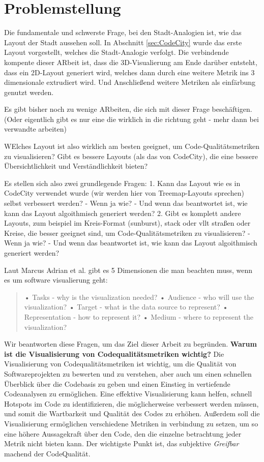 \section{Problemstellung} \label{sec:Problemstellung}
Die fundamentale und schwerste Frage, bei den Stadt-Analogien ist, wie das Layout der Stadt aussehen soll. In Abschnitt \ref{sec:CodeCity} wurde das erste Layout vorgestellt, welches die Stadt-Analogie verfolgt. Die verbindende kompente dieser ARbeit ist, dass die 3D-Visualierung am Ende darüber entsteht, dass ein 2D-Layout generiert wird, welches dann durch eine weitere Metrik ins 3 dimensionale extrudiert wird. Und Anschließend weitere Metriken als einfärbung genutzt werden.

Es gibt bisher noch zu wenige ARbeiten, die sich mit dieser Frage beschäftigen. (Oder eigentlich gibt es nur eine die wirklich in die richtung geht - mehr dann bei verwandte arbeiten)

WElches Layout ist also wirklich am besten geeignet, um Code-Qualitätsmetriken zu visualisieren? Gibt es bessere Layouts (als das von CodeCity), die eine bessere Übersichtlichkeit und Verständlichkeit bieten? 

Es stellen sich also zwei grundlegende Fragen:
1. Kann das Layout wie es in CodeCity verwendet wurde (wir werden hier von Treemap-Layouts sprechen) selbst verbessert werden? - Wenn ja wie? - Und wenn das beantwortet ist, wie kann das Layout algoithmisch generiert werden?
2. Gibt es komplett andere Layouts, zum beispiel im Kreis-Format (sunburst), stack oder vllt straßen oder Kreise, die besser geeignet sind, um Code-Qualitätsmetriken zu visualisieren? - Wenn ja wie? - Und wenn das beantwortet ist, wie kann das Layout algoithmisch generiert werden?

Laut Marcus Adrian et al.  gibt es 5 Dimensionen die man beachten muss, wenn es um software visualierung geht: 
\begin{quote}    
    • Tasks - why is the visualization needed?
    • Audience - who will use the visualization?
    • Target - what is the data source to represent?
    • Representation - how to represent it?
    • Medium - where to represent the visualization? \cite[2]{3dsoftwareMarcus}
\end{quote}

Wir beantworten diese Fragen, um das Ziel dieser Arbeit zu begründen.
\textbf{Warum ist die Visualisierung von Codequalitätsmetriken wichtig?}
Die Visualisierung von Codequalitätsmetriken ist wichtig, um die Qualität von Softwareprojekten zu bewerten und zu verstehen, aber auch um einen schnellen Überblick über die Codebasis zu geben und einen Einstieg in vertiefende Codeanalysen zu ermöglichen. Eine effektive Visualisierung kann helfen, schnell Hotspots im Code zu identifizieren, die möglicherweise verbessert werden müssen, und somit die Wartbarkeit und Qualität des Codes zu erhöhen. Außerdem soll die Visualisierung ermöglichen verschiedene Metriken in verbindung zu setzen, um so eine höhere Aussagekraft über den Code, den die einzelne betrachtung jeder Metrik nicht bieten kann.
Der wichtigste Punkt ist, das subjektive \textit{Greifbar} machend der CodeQualität.

